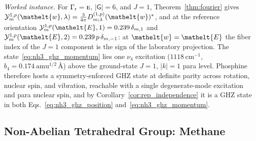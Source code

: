 \documentclass[
  reprint,
  aps,
  prx,
  superscriptaddress,
  amsmath,
  amssymb,
  longbibliography
]{revtex4-2}
\newcommand{\eltfont}[1]{{\let\sigma\eltsigma\mathelt{#1}}}
\newcommand{\grp}[1]{\mathsf{#1}}
\newcommand{\irr}[1]{\text{\normalfont\scshape #1}}
\newcommand{\elt}[1]{\eltfont{#1}}
\newcommand{\irrJp}[2]{D^{(#1,#2)}}
\newcommand{\crep}{\elt{w}}           %
\newcommand{\parity}{p}               %
\providecommand{\Grot}{\Gamma_{\mathrm{r}}}
\begin{document}
\emph{Worked instance.} For $\Grot=\irr{e}$, $|\grp{G}|=6$, and $J=1$, Theorem~\ref{thm:fourier} gives $\mathcal Y^{1,\parity}_m(\crep,\lambda)=\tfrac{3}{4\pi}\irrJp{1}{\parity}_{m;\lambda}(\crep)^{*}$, and at the reference orientation $\mathcal Y^{1,\parity}_m(\elt{E},1)=0.239\,\delta_{m,1}$ and $\mathcal Y^{1,\parity}_m(\elt{E},2)=0.239\,\parity\,\delta_{m,-1}$: at $\crep=\elt{E}$ the fiber index of the $J=1$ component is the sign of the laboratory projection. The state~\eqref{eq:nh3_ghz_momentum} lies one $\nu_4$ excitation ($1118\ \mathrm{cm^{-1}}$, $b_4=0.174\ \mathrm{amu^{1/2}\,\text{\AA}}$) above the ground-state $J=1$, $|k|=1$ para level. Phosphine therefore hosts a symmetry-enforced GHZ state at definite parity across rotation, nuclear spin, and vibration, reachable with a single degenerate-mode excitation and para nuclear spin, and by Corollary~\ref{cor:rep_independence} it is a GHZ state in both Eqs.~\eqref{eq:nh3_ghz_position} and~\eqref{eq:nh3_ghz_momentum}.




\subsection{Non-Abelian Tetrahedral Group: Methane}
\label{subsec:methane}
\end{document}

